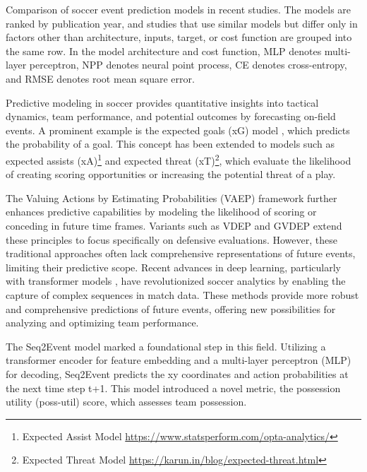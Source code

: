 \begin{table}[h]
\caption{Comparison of soccer event prediction models in recent studies. The models are ranked by publication year, and studies that use similar models but differ only in factors other than architecture, inputs, target, or cost function are grouped into the same row. In the model architecture and cost function, MLP denotes multi-layer perceptron, NPP denotes neural point process, CE denotes cross-entropy, and RMSE denotes root mean square error.}
\label{Tab:compare_event_model}
\end{table}

Predictive modeling in soccer provides quantitative insights into tactical dynamics, team performance, and potential outcomes by forecasting on-field events. A prominent example is the expected goals (xG) model \citep{eggels2016expected}, which predicts the probability of a goal. This concept has been extended to models such as expected assists (xA)\footnote{Expected Assist Model \url{https://www.statsperform.com/opta-analytics/}} and expected threat (xT)\footnote{Expected Threat Model \url{https://karun.in/blog/expected-threat.html}}, which evaluate the likelihood of creating scoring opportunities or increasing the potential threat of a play.

The Valuing Actions by Estimating Probabilities (VAEP) framework \citep{decroos2019actions} further enhances predictive capabilities by modeling the likelihood of scoring or conceding in future time frames. Variants such as VDEP \citep{toda2022evaluation} and GVDEP \citep{umemoto2022location} extend these principles to focus specifically on defensive evaluations. However, these traditional approaches often lack comprehensive representations of future events, limiting their predictive scope. Recent advances in deep learning, particularly with transformer models \citep{vaswani2017attention}, have revolutionized soccer analytics by enabling the capture of complex sequences in match data. These methods provide more robust and comprehensive predictions of future events, offering new possibilities for analyzing and optimizing team performance.

The Seq2Event model \citep{simpson2022seq2event} marked a foundational step in this field. Utilizing a transformer encoder for feature embedding and a multi-layer perceptron (MLP) for decoding, Seq2Event predicts the xy coordinates and action probabilities at the next time step t+1. This model introduced a novel metric, the possession utility (poss-util) score, which assesses team possession.

